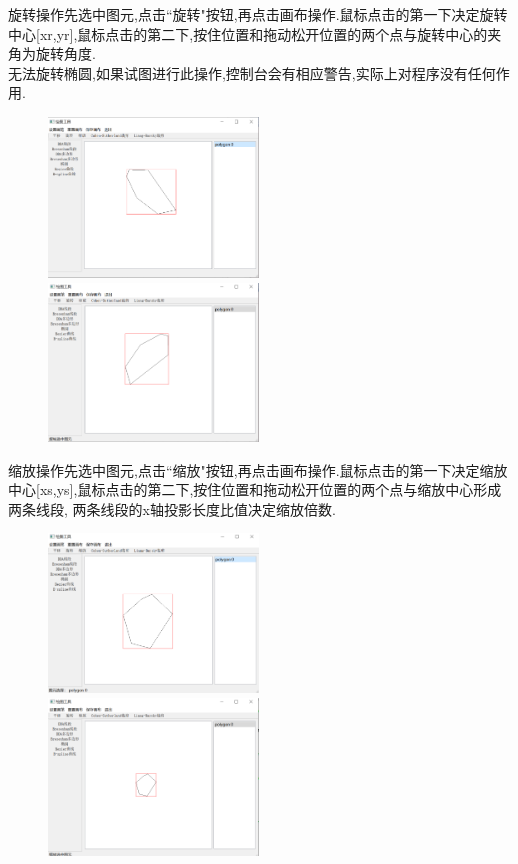 \documentclass[a4paper,UTF8]{article}
\theoremstyle{definition}
\begin{document}
旋转操作先选中图元,点击``旋转"按钮,再点击画布操作.鼠标点击的第一下决定旋转中心[xr,yr],鼠标点击的第二下,按住位置和拖动松开位置的两个点与旋转中心的夹角为旋转角度.\\
\indent 无法旋转椭圆,如果试图进行此操作,控制台会有相应警告,实际上对程序没有任何作用.
\begin{figure}[H]
	\centering
	\begin{minipage}[t]{0.5\linewidth}
		\includegraphics[width=2.2in]{rotate1.png}
	\end{minipage}%
	\begin{minipage}[t]{0.5\linewidth}
		\includegraphics[width=2.2in]{rotate2.png}
	\end{minipage}
\end{figure}
缩放操作先选中图元,点击``缩放"按钮,再点击画布操作.鼠标点击的第一下决定缩放中心[xs,ys],鼠标点击的第二下,按住位置和拖动松开位置的两个点与缩放中心形成两条线段, 两条线段的x轴投影长度比值决定缩放倍数.
\begin{figure}[H]
	\centering
	\begin{minipage}[t]{0.5\linewidth}
		\includegraphics[width=2.2in]{scale1.png}
	\end{minipage}%
	\begin{minipage}[t]{0.5\linewidth}
		\includegraphics[width=2.2in]{scale2.png}
	\end{minipage}
\end{figure}
\end{document}
